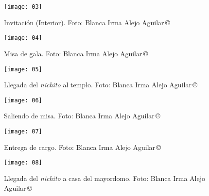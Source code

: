 \documentclass[14pt,letterpaper,twoside]{extbook} %
\begin{document}

\begin{figure}
\centering
\texttt{[image: 03]}
\renewcommand{\figurename}{Imagen}
\caption[Invitación (Interior)]{Invitación (Interior). Foto: Blanca Irma Alejo Aguilar\,\copyright}
\label{invitación_interior}
\end{figure}


\begin{figure}
\centering
\texttt{[image: 04]}
\renewcommand{\figurename}{Imagen}
\caption[Misa de gala]{Misa de gala. Foto: Blanca Irma Alejo Aguilar\,\copyright}
\label{misa_de_gala}
\end{figure}


\begin{figure}
\centering
\texttt{[image: 05]}
\renewcommand{\figurename}{Imagen}
\caption[Llegada del \textit{nichito} al templo]{Llegada del \textit{nichito} al templo. Foto: Blanca Irma Alejo Aguilar\,\copyright}
\label{llegada_del_nichito}
\end{figure}


\begin{figure}
\centering
\texttt{[image: 06]}
\renewcommand{\figurename}{Imagen}
\caption[Saliendo de misa]{Saliendo de misa. Foto: Blanca Irma Alejo Aguilar\,\copyright}
\label{saliendo_de_misa_1}
\end{figure}


\begin{figure}
\centering
\texttt{[image: 07]}
\renewcommand{\figurename}{Imagen}
\caption[Entrega de cargo]{Entrega de cargo. Foto: Blanca Irma Alejo Aguilar\,\copyright}
\label{entrega_de_cargo}
\end{figure}


\begin{figure}
\centering
\texttt{[image: 08]}
\renewcommand{\figurename}{Imagen}
\caption[Llegada del \textit{nichito} a casa del mayordomo]{Llegada del \textit{nichito} a casa del mayordomo. Foto: Blanca Irma Alejo Aguilar\,\copyright}
\label{llegada_del_nichito_casa_mayordomo}
\end{figure}

\end{document}
